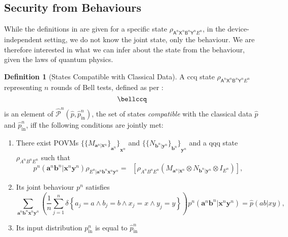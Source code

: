 \documentclass[10pt, a4paper]{article}
\numberwithin{equation}{section} %
\newcounter{stmt} %
\theoremstyle{definition}
\newtheorem{defn}[stmt]{Definition}
\theoremstyle{plain}
\newcommand{\?}{\mathrel{?}} %
\newcommand{\cvec}[1]{\boldsymbol{\mathbf{#1}}}    %
\newcommand{\indic}[1]{\delta{\left\{#1\right\}}} %
\newcommand{\Tr}[2][]{\mathop{\mathrm{Tr}#1}\left[ #2 \right]} %
\newcommand{\crv}[1]{\mathsf{#1}}
\newcommand{\compatstates}[3][]{\hat{\mathcal{P}}#1(#2,#3)}
\newcommand{\prin}[1][p]{#1_{\mathrm{in}}}
\begin{document}
    \subsection{Security from Behaviours}\label{sec:diqkd_behavsec}

    While the definitions in  are given for a specific state \(\rho_{\crv{A}^n\crv{X}^n \crv{B}^n\crv{Y}^n E^n}\), in the device-independent setting, we do not know the joint state, only the behaviour. We are therefore interested in what we can infer about the state from the behaviour, given the laws of quantum physics.

    \begin{defn}[States Compatible with Classical Data]
      A ccq state \(\rho_{\crv{A}^n\crv{X}^n \crv{B}^n\crv{Y}^n E^n}\) representing \(n\) rounds of Bell tests, defined as per :
      \begin{equation}
        \bellccq
      \end{equation}
      is an element of \(\compatstates[^n]{\hat{p}}{\prin[\hat{p}^n]}\), the set of states \emph{compatible} with the classical data \(\hat{p}\) and \(\prin[\hat{p}^n]\), iff the following conditions are jointly met:
      \begin{enumerate}
        \item There exist POVMs \({\{ {\{ M_{\cvec{a}^n|\cvec{x}^n}\}}_{\cvec{a}^n} \}}_{\cvec{x}^n}\) and \({\{ {\{ N_{\cvec{b}^n|\cvec{y}^n}\}}_{\cvec{b}^n} \}}_{\cvec{y}^n}\) and a qqq state \(\rho_{A^n B^n E^n}\) such that
          \begin{equation}\label{eqn:probmeas}
            p^n(\cvec{a}^n\cvec{b}^n|\cvec{x}^n\cvec{y}^n) \rho_{E^n|\cvec{a}^n\cvec{b}^n \cvec{x}^n\cvec{y}^n} = \Tr[_{A^n B^n}]{\rho_{A^n B^n E^n} \left(M_{\cvec{a}^n|\cvec{x}^n} \otimes N_{\cvec{b}^n|\cvec{y}^n} \otimes I_{E^n}\right) },
          \end{equation}
        \item Its joint behaviour \(p^n\) satisfies
          \begin{equation}
            \sum_{\cvec{a}^n\cvec{b}^n \cvec{x}^n\cvec{y}^n} \left( \frac{1}{n} \sum_{j=1}^n \indic{a_j = a \land b_j = b \land x_j = x \land y_j = y} \right) p^n(\cvec{a}^n\cvec{b}^n|\cvec{x}^n\cvec{y}^n) = \hat{p}(ab|xy),
          \end{equation}
        \item Its input distribution \(\prin^n\) is equal to \(\prin[\hat{p}^n]\)
      \end{enumerate}
    \end{defn}
\end{document}
